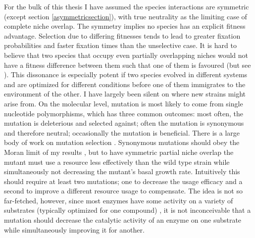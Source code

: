 For the bulk of this thesis I have assumed the species interactions are symmetric (except section \ref{asymmetricsection}), with true neutrality as the limiting case of complete niche overlap. 
The symmetry implies no species has an explicit fitness advantage. %
Selection due to differing fitnesses tends to lead to greater fixation probabilities and faster fixation times than the unselective case. 
It is hard to believe that two species that occupy even partially overlapping niches would not have a fitness difference between them such that one of them is favoured (but see \cite{Hubbell2006,Rosindell2011}). %
This dissonance is especially potent if two species evolved in different systems and are optimized for different conditions before one of them immigrates to the environment of the other. 
I have largely been silent on where new strains might arise from. 
On the molecular level, mutation is most likely to come from single nucleotide polymorphisms, which has three common outcomes: most often, the mutation is deleterious and selected against; often the mutation is synonymous and therefore neutral; occasionally the mutation is beneficial. 
There is a large body of work on mutation selection \cite{Kimura1983,Rouzine2001,Kawecki2004,Orr2005,Desai2007,Desai2007a,Patwa2008}. 
Synonymous mutations should obey the Moran limit of my results \cite{Kimura1955}, but to have symmetric partial niche overlap the mutant must use a resource less effectively than the wild type strain while simultaneously not decreasing the mutant's basal growth rate. 
Intuitively this should require at least two mutations; one to decrease the usage efficacy and a second to improve a different resource usage to compensate. 
The idea is not so far-fetched, however, since most enzymes have some activity on a variety of substrates (typically optimized for one compound) \cite{Gruning2010,Liscovitch1992}, it is not inconceivable that a mutation should decrease the catalytic activity of an enzyme on one substrate while simultaneously improving it for another. %

